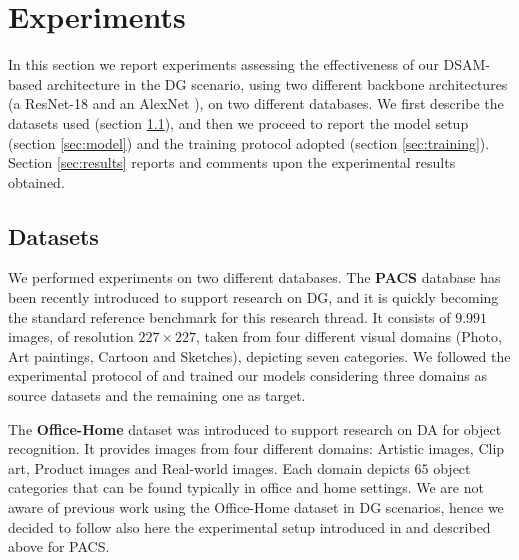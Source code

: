\section{Experiments}
\label{sec:expers}

In this section we report experiments assessing the effectiveness of our DSAM-based architecture in the DG scenario, using two different backbone architectures (a ResNet-18 \cite{he2016deep} and an AlexNet \cite{krizhevsky2012imagenet}), on two different databases. We first describe the datasets used (section \ref{sec:dataset}), and then we proceed to report the model setup (section \ref{sec:model}) and the training protocol adopted (section \ref{sec:training}). Section \ref{sec:results} reports and comments upon the experimental results obtained.

    \subsection{Datasets}
    \label{sec:dataset}

We performed experiments on two different databases. The \textbf{PACS} database \cite{li2017deeper} has been recently introduced to support research on DG, and it is quickly becoming the standard reference benchmark for this research thread. It consists of $9.991$ images, of resolution $227\times 227$, taken from four different visual domains (Photo, Art paintings, Cartoon and Sketches), depicting seven categories. We followed the experimental protocol of \cite{li2017deeper} and trained our models considering three domains as source datasets and the remaining one as target.

The \textbf{Office-Home} dataset \cite{venkateswara2017Deep} was introduced to support research on DA for object recognition. It provides images from four different domains: Artistic images, Clip art, Product images and Real-world images. Each domain depicts $65$ object categories that can be found typically in office and home settings. We are not aware of previous work using the Office-Home dataset in DG scenarios, hence we decided to follow also here the experimental setup introduced in \cite{li2017deeper} and described above for PACS.

